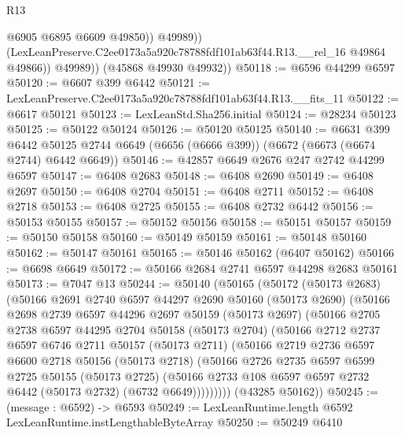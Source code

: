 \begin{lexlean}{R13}
\begin{coremodule}
                    @6905
                    @6895
                    @6609
                    @49850))
                @49989))
            (LexLeanPreserve.C2ee0173a5a920c78788fdf101ab63f44.R13.__rel_16 @49864 @49866))
          @49989))
      (@45868 @49930 @49932))
@50118 := @6596 @44299 @6597
@50120 := @6607 @399 @6442
@50121 := LexLeanPreserve.C2ee0173a5a920c78788fdf101ab63f44.R13.__fits_11
@50122 := @6617 @50121
@50123 := LexLeanStd.Sha256.initial
@50124 := @28234 @50123
@50125 := @50122 @50124
@50126 := @50120 @50125
@50140 := @6631
    @399
    @6442
    @50125
    @2744
    @6649
    (@6656 (@6666 @399))
    (@6672 (@6673 (@6674 @2744) @6442 @6649))
@50146 := @42857 @6649 @2676 @247 @2742 @44299 @6597
@50147 := @6408 @2683
@50148 := @6408 @2690
@50149 := @6408 @2697
@50150 := @6408 @2704
@50151 := @6408 @2711
@50152 := @6408 @2718
@50153 := @6408 @2725
@50155 := @6408 @2732 @6442
@50156 := @50153 @50155
@50157 := @50152 @50156
@50158 := @50151 @50157
@50159 := @50150 @50158
@50160 := @50149 @50159
@50161 := @50148 @50160
@50162 := @50147 @50161
@50165 := @50146 @50162 (@6407 @50162)
@50166 := @6698 @6649
@50172 := @50166 @2684 @2741 @6597 @44298 @2683 @50161
@50173 := @7047 @13
@50244 := @50140
    (@50165
      (@50172
        (@50173 @2683)
        (@50166
          @2691
          @2740
          @6597
          @44297
          @2690
          @50160
          (@50173 @2690)
          (@50166
            @2698
            @2739
            @6597
            @44296
            @2697
            @50159
            (@50173 @2697)
            (@50166
              @2705
              @2738
              @6597
              @44295
              @2704
              @50158
              (@50173 @2704)
              (@50166
                @2712
                @2737
                @6597
                @6746
                @2711
                @50157
                (@50173 @2711)
                (@50166
                  @2719
                  @2736
                  @6597
                  @6600
                  @2718
                  @50156
                  (@50173 @2718)
                  (@50166
                    @2726
                    @2735
                    @6597
                    @6599
                    @2725
                    @50155
                    (@50173 @2725)
                    (@50166 @2733 @108 @6597 @6597 @2732 @6442 (@50173 @2732) (@6732 @6649)))))))))
      (@43285 @50162))
@50245 := (message : @6592) -> @6593
@50249 := LexLeanRuntime.length @6592 LexLeanRuntime.instLengthableByteArray
@50250 := @50249 @6410

\end{coremodule}
\end{lexlean}
